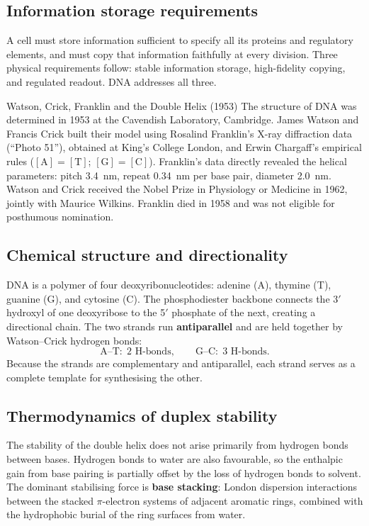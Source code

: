 \documentclass[12pt, a4paper, oneside]{report}
\begin{document}
\subsection{Information storage requirements}

A cell must store information sufficient to specify all its proteins and
regulatory elements, and must copy that information faithfully at every
division. Three physical requirements follow: stable information storage,
high-fidelity copying, and regulated readout. DNA addresses all three.

\begin{historicalnote}{Watson, Crick, Franklin and the Double Helix (1953)}
  The structure of DNA was determined in 1953 at the Cavendish Laboratory,
  Cambridge. James Watson and Francis Crick built their model using
  Rosalind Franklin's X-ray diffraction data (``Photo 51''), obtained
  at King's College London, and Erwin Chargaff's empirical rules
  ($[\text{A}]=[\text{T}]$; $[\text{G}]=[\text{C}]$). Franklin's data
  directly revealed the helical parameters: pitch 3.4~nm, repeat 0.34~nm
  per base pair, diameter 2.0~nm. Watson and Crick received the Nobel
  Prize in Physiology or Medicine in 1962, jointly with Maurice Wilkins.
  Franklin died in 1958 and was not eligible for posthumous nomination.
\end{historicalnote}

\subsection{Chemical structure and directionality}

DNA is a polymer of four deoxyribonucleotides: adenine (A), thymine (T),
guanine (G), and cytosine (C). The phosphodiester backbone connects the
3$'$ hydroxyl of one deoxyribose to the 5$'$ phosphate of the next,
creating a directional chain. The two strands run \textbf{antiparallel}
and are held together by Watson--Crick hydrogen bonds:
\[
  \text{A--T}: \; 2 \text{ H-bonds}, \qquad \text{G--C}: \; 3 \text{ H-bonds}.
\]
Because the strands are complementary and antiparallel, each strand
serves as a complete template for synthesising the other.


\subsection{Thermodynamics of duplex stability}

The stability of the double helix does not arise primarily from hydrogen
bonds between bases. Hydrogen bonds to water are also favourable, so
the enthalpic gain from base pairing is partially offset by the loss of
hydrogen bonds to solvent. The dominant stabilising force is
\textbf{base stacking}: London dispersion interactions between the
stacked $\pi$-electron systems of adjacent aromatic rings, combined
with the hydrophobic burial of the ring surfaces from water.
\end{document}
